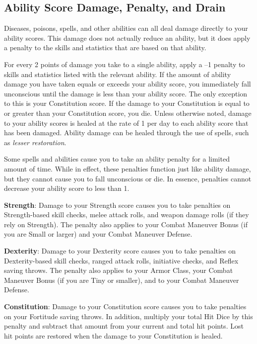 \subsection{Ability Score Damage, Penalty, and Drain}

				
Diseases, poisons, spells, and other abilities can all deal damage directly to your ability scores. This damage does not actually reduce an ability, but it does apply a penalty to the skills and statistics that are based on that ability.
				
For every 2 points of damage you take to a single ability, apply a --1 penalty to skills and statistics listed with the relevant ability. If the amount of ability damage you have taken equals or exceeds your ability score, you immediately fall unconscious until the damage is less than your ability score. The only exception to this is your Constitution score. If the damage to your Constitution is equal to or greater than your Constitution score, you die. Unless otherwise noted, damage to your ability scores is healed at the rate of 1 per day to each ability score that has been damaged. Ability damage can be healed through the use of spells, such as \textit{lesser restoration}. 
				
Some spells and abilities cause you to take an ability penalty for a limited amount of time. While in effect, these penalties function just like ability damage, but they cannot cause you to fall unconscious or die. In essence, penalties cannot decrease your ability score to less than 1.
				
\textbf{Strength}: Damage to your Strength score causes you to take penalties on Strength-based skill checks, melee attack rolls, and weapon damage rolls (if they rely on Strength). The penalty also applies to your Combat Maneuver Bonus (if you are Small or larger) and your Combat Maneuver Defense.
				
\textbf{Dexterity}: Damage to your Dexterity score causes you to take penalties on Dexterity-based skill checks, ranged attack rolls, initiative checks, and Reflex saving throws. The penalty also applies to your Armor Class, your Combat Maneuver Bonus (if you are Tiny or smaller), and to your Combat Maneuver Defense.
				
\textbf{Constitution}: Damage to your Constitution score causes you to take penalties on your Fortitude saving throws. In addition, multiply your total Hit Dice by this penalty and subtract that amount from your current and total hit points. Lost hit points are restored when the damage to your Constitution is healed.
				
